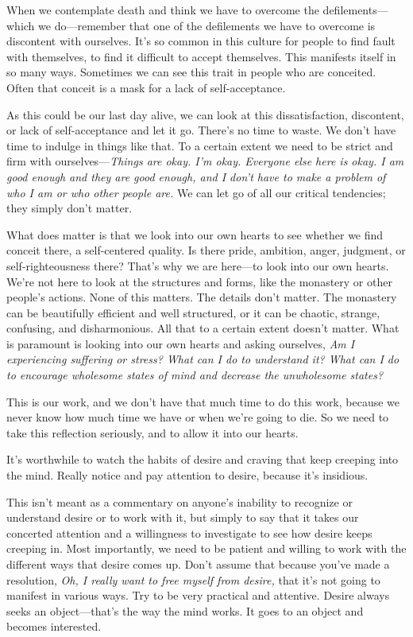 When we contemplate death and think we have to overcome the 
defilements---which we do---remember that one of the defilements we 
have to overcome is discontent with ourselves. It's so common in this 
culture for people to find fault with themselves, to find it difficult 
to accept themselves. This manifests itself in so many ways. Sometimes 
we can see this trait in people who are conceited. Often that conceit 
is a mask for a lack of self-acceptance.

As this could be our last day alive, we can look at this 
dissatisfaction, discontent, or lack of self-acceptance and let it go. 
There's no time to waste. We don't have time to indulge in things like 
that. To a certain extent we need to be strict and firm with 
ourselves---\emph{Things are okay. I'm okay. Everyone else here is 
okay. I am good enough and they are good enough, and I don't have to 
make a problem of who I am or who other people are.} We can let go of 
all our critical tendencies; they simply don't matter.

What does matter is that we look into our own hearts to see whether we
find conceit there, a self-centered quality. Is there pride, ambition,
anger, judgment, or self-righteousness there? That's why we are
here---to look into our own hearts. We're not here to look at the
structures and forms, like the monastery or other people's actions.
None of this matters. The details don't matter. The monastery can be
beautifully efficient and well structured, or it can be chaotic,
strange, confusing, and disharmonious. All that to a certain extent
doesn't matter. What is paramount is looking into our own hearts and
asking ourselves, \emph{Am I experiencing suffering or stress? What can
I do to \mbox{understand} it? What can I do to encourage wholesome
states of mind and decrease the unwholesome states?}

This is our work, and we don't have that much time to do this work, 
because we never know how much time we have or when we're going to die. 
So we need to take this reflection seriously, and to allow it into our 
hearts.


It's worthwhile to watch the habits of desire and craving that keep 
creeping into the mind. Really notice and pay attention to desire, 
because it's insidious.

This isn't meant as a commentary on anyone's inability to recognize or 
understand desire or to work with it, but simply to say that it takes 
our concerted attention and a willingness to investigate to see how 
desire keeps creeping in. Most importantly, we need to be patient and 
willing to work with the different ways that desire comes up. Don't 
assume that because you've made a resolution, \emph{Oh, I really want 
to free myself from desire,} that it's not going to manifest in various 
ways. Try to be very practical and attentive. Desire always seeks an 
object---that's the way the mind works. It goes to an object and 
becomes interested.

